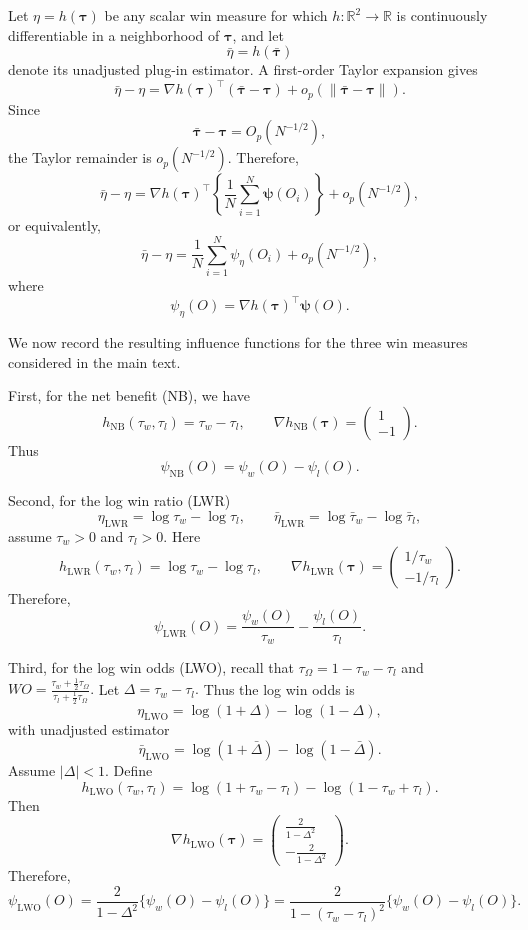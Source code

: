 \documentclass[11pt,a4paper]{article}
\begin{document}
Let \(\eta=h(\boldsymbol\tau)\) be any scalar win measure for which
\(h:\mathbb R^2\to\mathbb R\) is continuously differentiable in a neighborhood of
\(\boldsymbol\tau\), and let
\[
\bar\eta=h(\bar{\boldsymbol\tau})
\]
denote its unadjusted plug-in estimator. A first-order Taylor expansion gives
\[
\bar\eta-\eta
=
\nabla h(\boldsymbol\tau)^\top
(\bar{\boldsymbol\tau}-\boldsymbol\tau)
+
o_p\left(\|\bar{\boldsymbol\tau}-\boldsymbol\tau\|\right).
\]
Since
\[
\bar{\boldsymbol\tau}-\boldsymbol\tau=O_p(N^{-1/2}),
\]
the Taylor remainder is \(o_p(N^{-1/2})\). Therefore,
\[
\bar\eta-\eta
=
\nabla h(\boldsymbol\tau)^\top
\left\{
\frac1N
\sum_{i=1}^N
\boldsymbol\psi(O_i)
\right\}
+
o_p(N^{-1/2}),
\]
or equivalently,
\[
\bar\eta-\eta
=
\frac1N
\sum_{i=1}^N
\psi_\eta(O_i)
+
o_p(N^{-1/2}),
\]
where
\[
\boxed{
\psi_\eta(O)
=
\nabla h(\boldsymbol\tau)^\top\boldsymbol\psi(O).
}
\]

We now record the resulting influence functions for the three win measures considered in
the main text.

First, for the net benefit (NB), we have
\[
h_{\mathrm{NB}}(\tau_w,\tau_l)=\tau_w-\tau_l,
\qquad
\nabla h_{\mathrm{NB}}(\boldsymbol\tau)=
\begin{pmatrix}
1\\
-1
\end{pmatrix}.
\]
Thus
\[
\boxed{
\psi_\mathrm{NB}(O)=\psi_w(O)-\psi_l(O).
}
\]

Second, for the log win ratio (LWR)
\[
\eta_{\mathrm{LWR}}=\log\tau_w-\log\tau_l,
\qquad
\bar\eta_{\mathrm{LWR}}=\log\bar\tau_w-\log\bar\tau_l,
\]
assume \(\tau_w>0\) and \(\tau_l>0\). Here
\[
h_{\mathrm{LWR}}(\tau_w,\tau_l)=\log\tau_w-\log\tau_l,
\qquad
\nabla h_{\mathrm{LWR}}(\boldsymbol\tau)=
\begin{pmatrix}
1/\tau_w\\
-1/\tau_l
\end{pmatrix}.
\]
Therefore,
\[
\psi_\mathrm{LWR}(O)
=
\frac{\psi_w(O)}{\tau_w}
-
\frac{\psi_l(O)}{\tau_l}.
\]

Third, for the log win odds (LWO), recall that
$
\tau_\Omega=1-\tau_w-\tau_l
$
and
$
WO
=
\frac{\tau_w+\frac12\tau_\Omega}
{\tau_l+\frac12\tau_\Omega}.
$
Let
$\Delta=\tau_w-\tau_l.
$
Thus the log win odds is
\[
\eta_{\mathrm{LWO}}
=
\log(1+\Delta)-\log(1-\Delta),
\]
with unadjusted estimator
\[
\bar\eta_{\mathrm{LWO}}
=
\log(1+\bar\Delta)-\log(1-\bar\Delta).
\]
Assume \(|\Delta|<1\). Define
\[
h_{\mathrm{LWO}}(\tau_w,\tau_l)
=
\log(1+\tau_w-\tau_l)
-
\log(1-\tau_w+\tau_l).
\]
Then
\[
\nabla h_{\mathrm{LWO}}(\boldsymbol\tau)
=
\begin{pmatrix}
\displaystyle \frac{2}{1-\Delta^2}\\[6pt]
\displaystyle -\frac{2}{1-\Delta^2}
\end{pmatrix}.
\]
Therefore,
\[
\psi_\mathrm{LWO}(O)
=
\frac{2}{1-\Delta^2}
\{\psi_w(O)-\psi_l(O)\}
=
\frac{2}{1-(\tau_w-\tau_l)^2}
\{\psi_w(O)-\psi_l(O)\}.
\]
\end{document}
